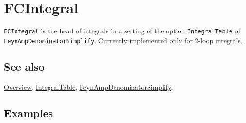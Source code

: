 \documentclass[../FeynCalcManual.tex]{subfiles}
\begin{document}
\hypertarget{fcintegral}{
\section{FCIntegral}\label{fcintegral}}

\texttt{FCIntegral} is the head of integrals in a setting of the option
\texttt{IntegralTable} of \texttt{FeynAmpDenominatorSimplify}. Currently
implemented only for 2-loop integrals.

\subsection{See also}

\hyperlink{toc}{Overview}, \hyperlink{integraltable}{IntegralTable},
\hyperlink{feynampdenominatorsimplify}{FeynAmpDenominatorSimplify}.

\subsection{Examples}
\end{document}
